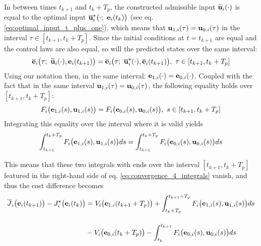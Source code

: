 \begin{gg_box}
In between times $t_{k+1}$ and $t_k + T_p$, the constructed admissible input
$\widetilde{\bm{\mathbf{u}}}_i(\cdot)$ is equal to the optimal
input $\overline{\vect{u}}_i^{\star}\big(\cdot;\ \vect{e}_i(t_k)\big)$
(see eq. \ref{eq:optimal_input_t_plus_one}), which means that
$\bm{\mathbf{u}}_{1,i}(\tau) = \bm{\mathbf{u}}_{0,i}(\tau)$ in the interval $\tau \in [t_{k+1}, t_k + T_p]$.
Since the initial conditions at $t=t_{k+1}$ are equal and the control laws
are also equal, so will the predicted states over the same interval:
\begin{align}
  \overline{\bm{\mathbf{e}}}_i\big(\tau;\ \widetilde{\bm{\mathbf{u}}}_i(\cdot), \bm{\mathbf{e}}_i(t_{k+1})\big) =
  \overline{\bm{\mathbf{e}}}_i\big(\tau;\ \overline{\bm{\mathbf{u}}}_i^{\star}(\cdot), \overline{\bm{\mathbf{e}}}_i(t_{k+1})\big), \ \tau \in [t_{k+1}, t_k + T_p]
  \label{eq:equal_predicted_without_disturbance}
\end{align}
Using our notation then, in the same interval:
$\bm{\mathbf{e}}_{1,i}(\cdot) = \bm{\mathbf{e}}_{0,i}(\cdot)$. Coupled with the fact that
in the same interval $\bm{\mathbf{u}}_{1,i}(\tau) = \bm{\mathbf{u}}_{0,i}(\tau)$, the following
equality holds over $[t_{k+1}, t_k + T_p]$:
\begin{align}
  F_i \big(\bm{\mathbf{e}}_{1,i}(s), \bm{\mathbf{u}}_{1,i} (s)\big) =
  F_i \big(\bm{\mathbf{e}}_{0,i}(s), \bm{\mathbf{u}}_{0,i} (s)\big),\ s \in [t_{k+1}, t_k + T_p]
\end{align}
Integrating this equality over the interval where it is valid yields
\begin{align}
  \int_{t_{k+1}}^{t_k + T_p}F_i \big(\bm{\mathbf{e}}_{1,i}(s), \bm{\mathbf{u}}_{1,i} (s)\big) ds =
  \int_{t_{k+1}}^{t_k + T_p}F_i \big(\bm{\mathbf{e}}_{0,i}(s), \bm{\mathbf{u}}_{0,i} (s)\big) ds
\end{align}
\end{gg_box}
This means that these two integrals with ends over the interval
$[t_{k+1}, t_k + T_p]$ featured in the right-hand side of eq.
\eqref{eq:convergence_4_integrals} vanish, and thus the cost difference becomes
\begin{align}
  \overline{J}_i\big(\bm{\mathbf{e}}_i(t_{k+1})\big) - J_i^{\star}\big(\bm{\mathbf{e}}_i(t_k)\big) &=
    V_i \big(\bm{\mathbf{e}}_{1,i} (t_{k+1} + T_p)\big)
    +\int_{t_k + T_p}^{t_{k+1} + T_p} F_i \big(\bm{\mathbf{e}}_{1,i}(s), \bm{\mathbf{u}}_{1,i} (s)\big) d s \\[2.5ex]
    &-V_i \big(\bm{\mathbf{e}}_{0,i} (t_k + T_p)\big)
    -\int_{t_k}^{t_{k+1}} F_i \big(\bm{\mathbf{e}}_{0,i}(s), \bm{\mathbf{u}}_{0,i} (s)\big) d s
\label{eq:convergence_2_integrals}
\end{align}

